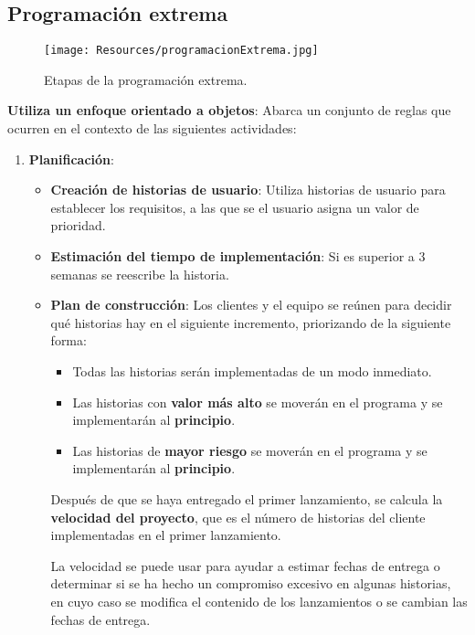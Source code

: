 \subsection{Programación extrema}
\begin{figure}[H]
   \centering
   \texttt{[image: Resources/programacionExtrema.jpg]}
   \caption{Etapas de la programación extrema.}
   \label{fig:programacionExtrema}
\end{figure}
\textbf{Utiliza un enfoque orientado a objetos}: Abarca un conjunto de reglas que ocurren en el contexto de las siguientes actividades:
\begin{enumerate}

   \item \textbf{Planificación}:
         \begin{itemize}

            \item \textbf{Creación de historias de usuario}: Utiliza historias de usuario para establecer los requisitos, a las que se el usuario asigna un valor de prioridad.
            \item \textbf{Estimación del tiempo de implementación}: Si es superior a 3 semanas se reescribe la historia.

            \item \textbf{Plan de construcción}: Los clientes y el equipo se reúnen para decidir qué historias hay en el siguiente incremento, priorizando de la siguiente forma:
                  \begin{itemize}
                     \item Todas las historias serán implementadas de un modo inmediato.
                     \item Las historias con \textbf{valor más alto} se moverán en el programa y se implementarán al \textbf{principio}.
                     \item Las historias de \textbf{mayor riesgo} se moverán en el programa y se implementarán al \textbf{principio}.
                  \end{itemize}
                  Después de que se haya entregado el primer lanzamiento, se calcula la \textbf{velocidad del proyecto}, que es el número de historias del cliente implementadas en el primer lanzamiento.

                  La velocidad se puede usar para ayudar a estimar fechas de entrega o determinar si se ha hecho un compromiso excesivo en algunas historias, en cuyo caso se modifica el contenido de los lanzamientos o se cambian las fechas de entrega.


\end{itemize}
\end{enumerate}
